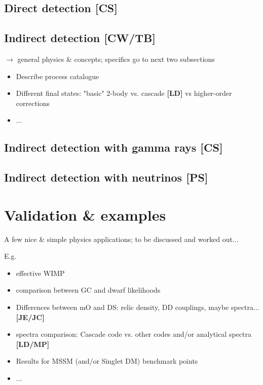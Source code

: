 \subsection{Direct detection {\bf [CS]}}
\label{code_dd}



\subsection{Indirect detection {\bf [CW/TB]}}
\label{code_id}

$\to$ general physics \& concepts; specifics go to next two subsections
\begin{itemize}
\item Describe process catalogue 
\item Different final states: "basic" 2-body vs. cascade {\bf [LD]} vs higher-order corrections
\item...
\end{itemize}

\subsection{Indirect detection with gamma rays {\bf [CS]}}
\label{code_ga}

\subsection{Indirect detection with neutrinos {\bf [PS]}}
\label{code_nu}



\section{Validation \& examples}
\label{examples}

A few nice \& simple physics applications; to be discussed and worked out...

E.g.
\begin{itemize}
\item effective WIMP
\item comparison between GC and dwarf likelihoods
\item Differences between mO and DS: relic density, DD couplings, maybe spectra... {\bf [JE/JC]}
\item spectra comparison: Cascade code vs. other codes and/or analytical spectra  {\bf [LD/MP]}
\item Results for MSSM (and/or Singlet DM) benchmark points
\item  ...
\end{itemize}

